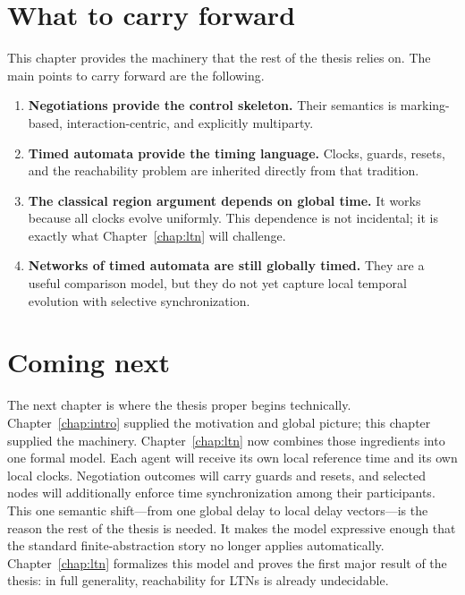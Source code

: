 
\section{What to carry forward}
\label{sec:prelim-takeaway}

This chapter provides the machinery that the rest of the thesis relies on. The main points to carry forward are the following.

\begin{enumerate}
    \item \textbf{Negotiations provide the control skeleton.} Their semantics is marking-based, interaction-centric, and explicitly multiparty.
    \item \textbf{Timed automata provide the timing language.} Clocks, guards, resets, and the reachability problem are inherited directly from that tradition.
    \item \textbf{The classical region argument depends on global time.} It works because all clocks evolve uniformly. This dependence is not incidental; it is exactly what Chapter~\ref{chap:ltn} will challenge.
    \item \textbf{Networks of timed automata are still globally timed.} They are a useful comparison model, but they do not yet capture local temporal evolution with selective synchronization.
\end{enumerate}

\section{Coming next}
\label{sec:prelim-next}

The next chapter is where the thesis proper begins technically. Chapter~\ref{chap:intro} supplied the motivation and global picture; this chapter supplied the machinery. Chapter~\ref{chap:ltn} now combines those ingredients into one formal model. Each agent will receive its own local reference time and its own local clocks. Negotiation outcomes will carry guards and resets, and selected nodes will additionally enforce time synchronization among their participants. This one semantic shift---from one global delay to local delay vectors---is the reason the rest of the thesis is needed. It makes the model expressive enough that the standard finite-abstraction story no longer applies automatically. Chapter~\ref{chap:ltn} formalizes this model and proves the first major result of the thesis: in full generality, reachability for LTNs is already undecidable.

